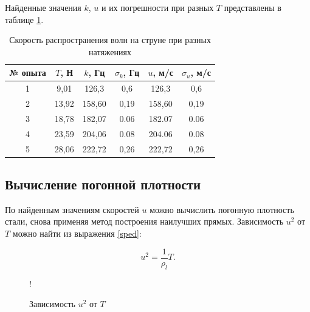 \documentclass[a4paper,12pt]{article} %
\begin{document}
Найденные значения $ k $, $ u $ и их погрешности при разных $ T $ представлены в таблице \ref{tab:velocys}.

\begin{table}[h]
    \centering
    \begin{tabular}{|c|c|c|c|c|c|}
    \hline
    № опыта & $ T $, Н & $ k $, Гц & $ \sigma_k $, Гц & $ u $, м/с & $ \sigma_u $, м/с \\ 
    \hline
    1 & 9,01 & 126,3 & 0,6 & 126,3 & 0,6 \\
    \hline
    2 & 13,92 & 158,60 & 0,19 & 158,60 & 0,19 \\
    \hline
    3 & 18,78 & 182,07 & 0.06 & 182.07 & 0.06 \\
    \hline
    4 & 23,59 & 204,06 & 0.08 & 204.06 & 0.08 \\
    \hline
    5 & 28,06 & 222,72 & 0,26 & 222,72 & 0,26 \\
    \hline
    \end{tabular}
    \caption{Скорость распространения волн на струне при разных натяжениях}
    \label{tab:velocys}
\end{table}

\subsection{Вычисление погонной плотности}

По найденным значениям скоростей $ u $ можно вычислить погонную плотность стали, снова применяя метод построения наилучших прямых. Зависимость $ u^2 $ от $ T $ можно найти из выражения \eqref{sped}:

\begin{equation}
    u^2 = \frac{1}{\rho_l} T.
\end{equation}

\begin{figure}
\centering
{} {!} {
}
\caption{Зависимость $ u^2 $ от $ T $}
\label{graphtoo}
\end{figure}
\end{document}
